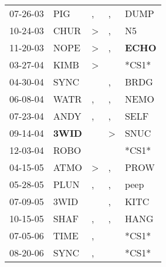\begin{supertabular}{p{0.07\textwidth}p{0.06\textwidth}p{0.02\textwidth}p{0.02\textwidth}p{0.06\textwidth}}
          07-26-03\textsuperscript{} &            PIG\textsuperscript{} &                , &             , &           DUMP\textsuperscript{} \\
          10-24-03\textsuperscript{} &           CHUR\textsuperscript{} &     \textgreater &             , &             N5\textsuperscript{} \\
          11-20-03\textsuperscript{} &           NOPE\textsuperscript{} &     \textgreater &             , &  \textbf{ECHO\textsuperscript{}} \\
          03-27-04\textsuperscript{} &           KIMB\textsuperscript{} &     \textgreater &               &                            *CS1* \\
          04-30-04\textsuperscript{} &           SYNC\textsuperscript{} &                  &             , &           BRDG\textsuperscript{} \\
          06-08-04\textsuperscript{} &           WATR\textsuperscript{} &                , &             , &           NEMO\textsuperscript{} \\
          07-23-04\textsuperscript{} &           ANDY\textsuperscript{} &                , &             , &           SELF\textsuperscript{} \\
          09-14-04\textsuperscript{} &  \textbf{3WID\textsuperscript{}} &                  &  \textgreater &           SNUC\textsuperscript{} \\
          12-03-04\textsuperscript{} &           ROBO\textsuperscript{} &                  &               &                            *CS1* \\
          04-15-05\textsuperscript{} &           ATMO\textsuperscript{} &     \textgreater &             , &           PROW\textsuperscript{} \\
          05-28-05\textsuperscript{} &           PLUN\textsuperscript{} &                , &             , &           peep\textsuperscript{} \\
          07-09-05\textsuperscript{} &           3WID\textsuperscript{} &                  &             , &           KITC\textsuperscript{} \\
          10-15-05\textsuperscript{} &           SHAF\textsuperscript{} &                , &             , &           HANG\textsuperscript{} \\
          07-05-06\textsuperscript{} &           TIME\textsuperscript{} &                , &               &                            *CS1* \\
          08-20-06\textsuperscript{} &           SYNC\textsuperscript{} &                , &               &                            *CS1* \\

\end{supertabular}
